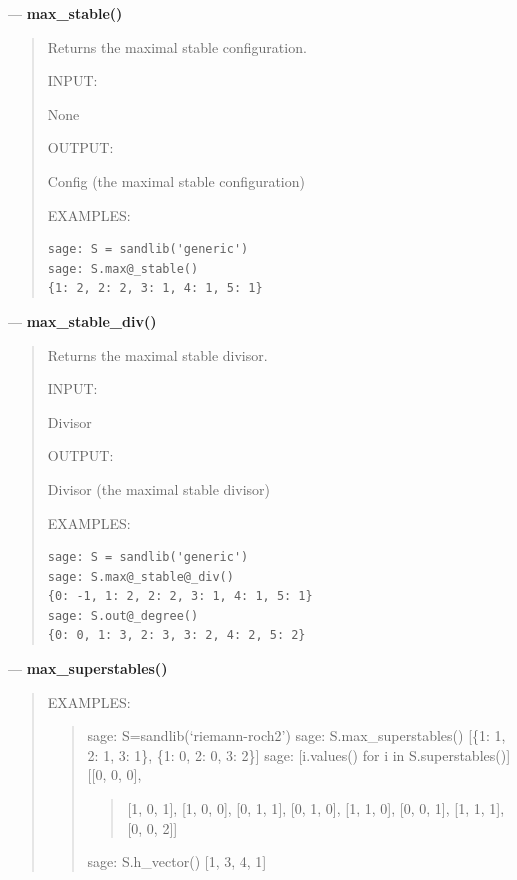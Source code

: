 \documentclass[letterpaper,10pt,english]{manual}
\begin{document}
---
\hypertarget{max-stable}{}
\textbf{max\_stable()}
\begin{quote}

Returns the maximal stable configuration.

INPUT:

None

OUTPUT:

Config (the maximal stable configuration)

EXAMPLES:

\begin{Verbatim}[commandchars=@\[\]]
sage: S = sandlib('generic')
sage: S.max@_stable()
{1: 2, 2: 2, 3: 1, 4: 1, 5: 1}
\end{Verbatim}
\end{quote}

---
\hypertarget{max-stable-div}{}
\textbf{max\_stable\_div()}
\begin{quote}

Returns the maximal stable divisor.

INPUT:

Divisor

OUTPUT:

Divisor (the maximal stable divisor)

EXAMPLES:

\begin{Verbatim}[commandchars=@\[\]]
sage: S = sandlib('generic')
sage: S.max@_stable@_div()
{0: -1, 1: 2, 2: 2, 3: 1, 4: 1, 5: 1}
sage: S.out@_degree()
{0: 0, 1: 3, 2: 3, 3: 2, 4: 2, 5: 2}
\end{Verbatim}
\end{quote}

---
\hypertarget{max-superstables}{}
\textbf{max\_superstables()}
\begin{quote}

EXAMPLES:
\begin{quote}

sage: S=sandlib(`riemann-roch2')
sage: S.max\_superstables()
{[}\{1: 1, 2: 1, 3: 1\}, \{1: 0, 2: 0, 3: 2\}{]}
sage: {[}i.values() for i in S.superstables(){]}
{[}{[}0, 0, 0{]},
\begin{quote}

{[}1, 0, 1{]},
{[}1, 0, 0{]},
{[}0, 1, 1{]},
{[}0, 1, 0{]},
{[}1, 1, 0{]},
{[}0, 0, 1{]},
{[}1, 1, 1{]},
{[}0, 0, 2{]}{]}
\end{quote}

sage: S.h\_vector()
{[}1, 3, 4, 1{]}
\end{quote}
\end{quote}
\end{document}
